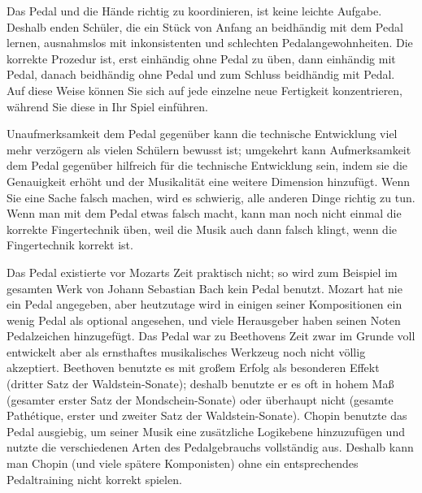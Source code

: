Das Pedal und die Hände richtig zu koordinieren, ist keine leichte Aufgabe.
Deshalb enden Schüler, die ein Stück von Anfang an beidhändig mit dem Pedal lernen, ausnahmslos mit inkonsistenten und schlechten Pedalangewohnheiten.
Die korrekte Prozedur ist, erst einhändig ohne Pedal zu üben, dann einhändig mit Pedal, danach beidhändig ohne Pedal und zum Schluss beidhändig mit Pedal.
Auf diese Weise können Sie sich auf jede einzelne neue Fertigkeit konzentrieren, während Sie diese in Ihr Spiel einführen.

Unaufmerksamkeit dem Pedal gegenüber kann die technische Entwicklung viel mehr verzögern als vielen Schülern bewusst ist; umgekehrt kann Aufmerksamkeit dem Pedal gegenüber hilfreich für die technische Entwicklung sein, indem sie die Genauigkeit erhöht und der Musikalität eine weitere Dimension hinzufügt.
Wenn Sie eine Sache falsch machen, wird es schwierig, alle anderen Dinge richtig zu tun.
Wenn man mit dem Pedal etwas falsch macht, kann man noch nicht einmal die korrekte Fingertechnik üben, weil die Musik auch dann falsch klingt, wenn die Fingertechnik korrekt ist.

Das Pedal existierte vor Mozarts Zeit praktisch nicht;
so wird zum Beispiel im gesamten Werk von Johann Sebastian Bach kein Pedal benutzt.
Mozart hat nie ein Pedal angegeben, aber heutzutage wird in einigen seiner Kompositionen ein wenig Pedal als optional angesehen, und viele Herausgeber haben seinen Noten Pedalzeichen hinzugefügt.
Das Pedal war zu Beethovens Zeit zwar im Grunde voll entwickelt aber als ernsthaftes musikalisches Werkzeug noch nicht völlig akzeptiert.
Beethoven benutzte es mit großem Erfolg als besonderen Effekt (dritter Satz der Waldstein-Sonate);
deshalb benutzte er es oft in hohem Maß (gesamter erster Satz der Mondschein-Sonate) oder überhaupt nicht (gesamte Pathétique, erster und zweiter Satz der Waldstein-Sonate). Chopin benutzte das Pedal ausgiebig, um seiner Musik eine zusätzliche Logikebene hinzuzufügen und nutzte die verschiedenen Arten des Pedalgebrauchs vollständig aus.
Deshalb kann man Chopin (und viele spätere Komponisten) ohne ein entsprechendes Pedaltraining nicht korrekt spielen.

